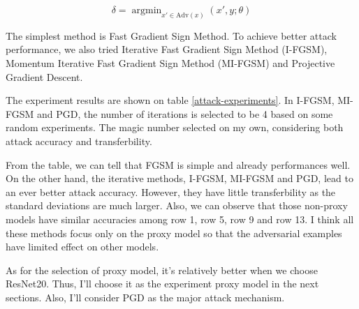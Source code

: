 \documentclass{article}
\begin{document}
\begin{equation}
  \delta = \mathop{\arg\min}_{x' \in \mathrm{Adv}(x)} (x', y; \theta)
\end{equation}

The simplest method is Fast Gradient Sign Method\cite{goodfellow2014explaining}. To achieve better attack performance, we also tried Iterative Fast Gradient Sign Method (I-FGSM)\cite{kurakin2016adversarial}, Momentum Iterative Fast Gradient Sign Method (MI-FGSM)\cite{dong2018boosting} and Projective Gradient Descent\cite{madry2017towards}.

The experiment results are shown on table \ref{attack-experiments}. In I-FGSM, MI-FGSM and PGD, the number of iterations is selected to be 4 based on some random experiments. The magic number selected on my own, considering both attack accuracy and transferbility.

From the table, we can tell that FGSM is simple and already performances well. On the other hand, the iterative methods, I-FGSM, MI-FGSM and PGD, lead to an ever better attack accuracy. However, they have little transferbility as the standard deviations are much larger. Also, we can observe that those non-proxy models have similar accuracies among row 1, row 5, row 9 and row 13. I think all these methods focus only on the proxy model so that the adversarial examples have limited effect on other models.

As for the selection of proxy model, it's relatively better when we choose ResNet20. Thus, I'll choose it as the experiment proxy model in the next sections. Also, I'll consider PGD as the major attack mechanism.
\end{document}
